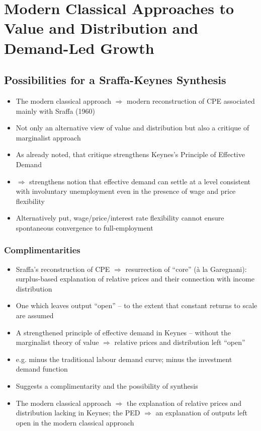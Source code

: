 \documentclass{article}
\begin{document}
\section{Modern Classical Approaches to Value and Distribution and Demand-Led Growth}
\subsection{Possibilities for a Sraffa-Keynes Synthesis}
	\begin{itemize}
		\item The modern classical approach \( \Rightarrow \) modern reconstruction of CPE associated mainly with Sraffa (1960)
		\item Not only an alternative view of value and distribution but also a critique of marginalist approach
		\item As already noted, that critique strengthens Keynes's Principle of Effective Demand
		\item \( \Rightarrow \) strengthens notion that effective demand can settle at a level consistent with involuntary unemployment even in the presence of wage and price flexibility
		\item Alternatively put, wage/price/interest rate flexibility cannot ensure spontaneous convergence to full-employment
	\end{itemize}
\subsubsection{Complimentarities}
	\begin{itemize}
		\item Sraffa's reconstruction of CPE \( \Rightarrow \) resurrection of ``core'' (à la Garegnani): surplus-based explanation of relative prices and their connection with income distribution
		\item One which leaves output ``open'' -- to the extent that constant returns to scale are assumed
		\item A strengthened principle of effective demand in Keynes -- without the marginalist theory of value \( \Rightarrow \) relative prices and distribution left ``open''
		\item e.g. minus the traditional labour demand curve; minus the investment demand function
		\item Suggests a complimentarity and the possibility of synthesis
		\item The modern classical approach \( \Rightarrow \) the explanation of relative prices and distribution lacking in Keynes; the PED \( \Rightarrow \) an explanation of outputs left open in the modern classical approach
	\end{itemize}
\end{document}
